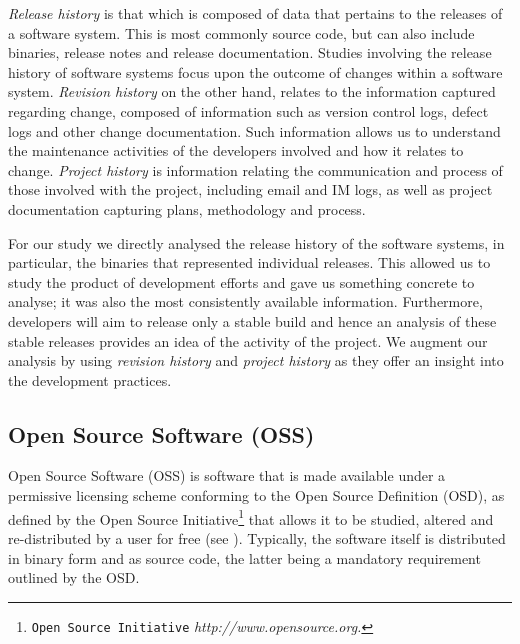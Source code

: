 \emph{Release history} is that which is composed of data that pertains to the releases of a software system. This is most commonly source code, but can also include binaries, release notes and release documentation. Studies involving the release history of software systems focus upon the outcome of changes within a software system. \emph{Revision history} on the other hand, relates to the information captured regarding change, composed of information such as version control logs, defect logs and other change documentation. Such information allows us to understand the maintenance activities of the developers involved and how it relates to change. \emph{Project history} is information relating the communication and process of those involved with the project, including email and IM logs, as well as project documentation capturing plans, methodology and process.

For our study we directly analysed the release history of the software systems, in particular, the binaries that represented individual releases. This allowed us to study the product of development efforts and gave us something concrete to analyse; it was also the most consistently available information. Furthermore, developers will aim to release only a stable build and hence an analysis of these stable releases provides an idea of the activity of the project. We augment our analysis by using \emph{revision history} and \emph{project history} as they offer an insight into the development practices.


\subsection{Open Source Software (OSS)} %
\label{sub:open_source_software_oss_}

Open Source Software (OSS) is software that is made available under a permissive licensing scheme conforming to the Open Source Definition (OSD), as defined by the Open Source Initiative\footnote{\texttt{Open Source Initiative} \emph{http://www.opensource.org.}} that allows it to be studied, altered and re-distributed by a user for free (see ). Typically, the software itself is distributed in binary form and as source code, the latter being a mandatory requirement outlined by the OSD.

